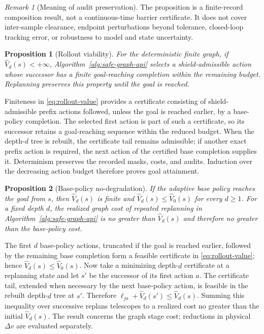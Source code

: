 \documentclass{IEEEtaes}
\newtheorem{proposition}{Proposition}
\theoremstyle{remark}
\newtheorem{remark}{Remark}
\theoremstyle{plain}
\begin{document}
\begin{remark}[Meaning of audit preservation]
The proposition is a finite-record composition result, not a continuous-time barrier certificate. It does not cover inter-sample clearance, endpoint perturbations beyond tolerance, closed-loop tracking error, or robustness to model and state uncertainty.
\end{remark}

\begin{proposition}[Rollout viability]
\label{prop:rollout-viability}
For the deterministic finite graph, if $\widehat V_d(s)<+\infty$, Algorithm~\ref{alg:safe-graph-api} selects a shield-admissible action whose successor has a finite goal-reaching completion within the remaining budget. Replanning preserves this property until the goal is reached.
\end{proposition}

\begin{IEEEproof}
Finiteness in \eqref{eq:rollout-value} provides a certificate consisting of shield-admissible prefix actions followed, unless the goal is reached earlier, by a base-policy completion. The selected first action is part of such a certificate, so its successor retains a goal-reaching sequence within the reduced budget. When the depth-$d$ tree is rebuilt, the certificate tail remains admissible; if another exact prefix action is required, the next action of the certified base completion supplies it. Determinism preserves the recorded masks, costs, and audits. Induction over the decreasing action budget therefore proves goal attainment.
\end{IEEEproof}

\begin{proposition}[Base-policy no-degradation]
\label{prop:base-bound}
If the adaptive base policy reaches the goal from $s$, then $\widehat V_d(s)$ is finite and $\widehat V_d(s)\le\widehat V_0(s)$ for every $d\ge1$. For a fixed depth $d$, the realized graph cost of repeated replanning in Algorithm~\ref{alg:safe-graph-api} is no greater than $\widehat V_d(s)$ and therefore no greater than the base-policy cost.
\end{proposition}

\begin{IEEEproof}
The first $d$ base-policy actions, truncated if the goal is reached earlier, followed by the remaining base completion form a feasible certificate in \eqref{eq:rollout-value}; hence $\widehat V_d(s)\le\widehat V_0(s)$. Now take a minimizing depth-$d$ certificate at a replanning state and let $s'$ be the successor of its first action $a$. The certificate tail, extended when necessary by the next base-policy action, is feasible in the rebuilt depth-$d$ tree at $s'$. Therefore $\ell_{ja}+\widehat V_d(s')\le\widehat V_d(s)$. Summing this inequality over successive replans telescopes to a realized cost no greater than the initial $\widehat V_d(s)$. The result concerns the graph stage cost; reductions in physical $\Delta v$ are evaluated separately.
\end{IEEEproof}
\end{document}
